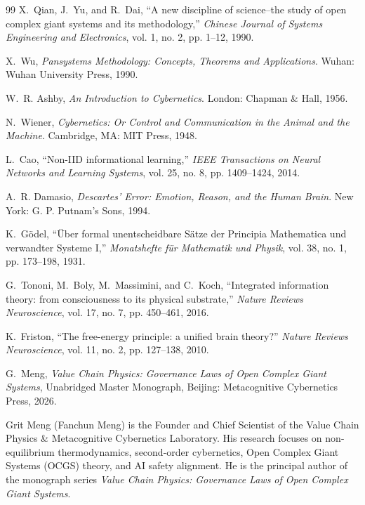 \documentclass[journal,twocolumn,10pt]{IEEEtran}
\begin{document}
\begin{thebibliography}{99}
X.~Qian, J.~Yu, and R.~Dai, ``A new discipline of science--the study of open complex giant systems and its methodology,'' \emph{Chinese Journal of Systems Engineering and Electronics}, vol. 1, no. 2, pp. 1--12, 1990.

X.~Wu, \emph{Pansystems Methodology: Concepts, Theorems and Applications}. Wuhan: Wuhan University Press, 1990.

W.~R. Ashby, \emph{An Introduction to Cybernetics}. London: Chapman \& Hall, 1956.

N.~Wiener, \emph{Cybernetics: Or Control and Communication in the Animal and the Machine}. Cambridge, MA: MIT Press, 1948.

L.~Cao, ``Non-IID informational learning,'' \emph{IEEE Transactions on Neural Networks and Learning Systems}, vol. 25, no. 8, pp. 1409--1424, 2014.

A.~R. Damasio, \emph{Descartes' Error: Emotion, Reason, and the Human Brain}. New York: G. P. Putnam's Sons, 1994.

K.~G{\"o}del, ``{\"U}ber formal unentscheidbare S{\"a}tze der Principia Mathematica und verwandter Systeme I,'' \emph{Monatshefte f{\"u}r Mathematik und Physik}, vol. 38, no. 1, pp. 173--198, 1931.

G.~Tononi, M.~Boly, M.~Massimini, and C.~Koch, ``Integrated information theory: from consciousness to its physical substrate,'' \emph{Nature Reviews Neuroscience}, vol. 17, no. 7, pp. 450--461, 2016.

K.~Friston, ``The free-energy principle: a unified brain theory?'' \emph{Nature Reviews Neuroscience}, vol. 11, no. 2, pp. 127--138, 2010.

G.~Meng, \emph{Value Chain Physics: Governance Laws of Open Complex Giant Systems}, Unabridged Master Monograph, Beijing: Metacognitive Cybernetics Press, 2026.
\end{thebibliography}

\begin{IEEEbiographynophoto}{Grit Meng (Fanchun Meng)}
is the Founder and Chief Scientist of the Value Chain Physics \& Metacognitive Cybernetics Laboratory. His research focuses on non-equilibrium thermodynamics, second-order cybernetics, Open Complex Giant Systems (OCGS) theory, and AI safety alignment. He is the principal author of the monograph series \emph{Value Chain Physics: Governance Laws of Open Complex Giant Systems}.
\end{IEEEbiographynophoto}
\end{document}
